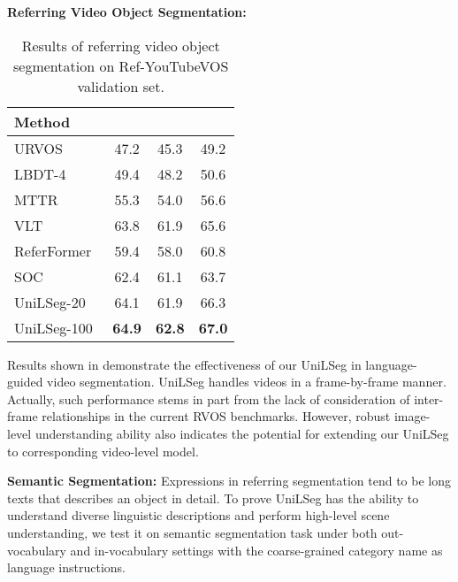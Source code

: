 \documentclass[10pt,twocolumn,letterpaper]{article}
\newcommand{\MethodName}{UniLSeg\xspace}
\begin{document}
\vspace{5pt}
\noindent \textbf{Referring Video Object Segmentation:}
\begin{table}[t]
   \centering
   \small
  \renewcommand\arraystretch{1.1}
  \setlength{\tabcolsep}{14.5pt}
  \caption{Results of referring video object segmentation on Ref-YouTubeVOS validation set.}
\begin{tabular}{l|c|c|c}
\hline
      Method &  &   & \\
      \hline
      URVOS~\cite{urvos} & 47.2 & 45.3 & 49.2\\
      LBDT-4~\cite{lbdt} & 49.4 & 48.2 & 50.6\\
      MTTR~\cite{mttr} & 55.3 & 54.0 & 56.6\\
      VLT~\cite{vlt} &63.8 &61.9 &65.6 \\
      ReferFormer~\cite{referformer} &59.4	&58.0	&60.8\\
      SOC~\cite{soc} & 62.4 &61.1 &63.7   \\
\hline
      \MethodName-20 &64.1 &61.9 &66.3\\
      \MethodName-100 &\textbf{64.9} &\textbf{62.8} &\textbf{67.0}\\
\hline
   \end{tabular}
   \label{tab:rvos}
   \vspace{-5pt}
\end{table} Results shown in  demonstrate the effectiveness of our \MethodName in language-guided video segmentation. \MethodName handles videos in a frame-by-frame manner.
Actually, such performance stems in part from the lack of consideration of inter-frame relationships in the current RVOS benchmarks. However, robust image-level understanding ability also indicates the potential for extending our \MethodName to corresponding video-level model.

\vspace{5pt}
\noindent \textbf{Semantic Segmentation:}
Expressions in referring segmentation tend to be long texts that describes an object in detail.
To prove \MethodName has the ability to understand diverse linguistic descriptions and perform high-level scene understanding, we test it on semantic segmentation task under both out-vocabulary and in-vocabulary  settings with the coarse-grained category name as language instructions. 
\end{document}
